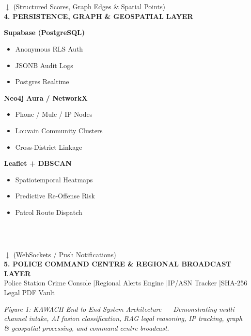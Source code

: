 \documentclass[10pt]{article}
\begin{document}
\begin{center}
{\begin{minipage}{0.98\linewidth}
\begin{minipage}[t]{0.48\linewidth}
\begin{itemize}[leftmargin=8pt,topsep=1pt,itemsep=1pt]
\end{itemize}
\end{minipage}\\
\vspace{2pt}
\hrulefill\\
\begin{center}
$\downarrow$ (Structured Scores, Graph Edges \& Spatial Points)\\
\textbf{4. PERSISTENCE, GRAPH \& GEOSPATIAL LAYER}\\
\end{center}
\begin{minipage}[t]{0.31\linewidth}
\raggedright
\textbf{Supabase (PostgreSQL)}
\begin{itemize}[leftmargin=8pt,topsep=1pt,itemsep=1pt]
\item Anonymous RLS Auth
\item JSONB Audit Logs
\item Postgres Realtime
\end{itemize}
\end{minipage}
\hfill
\begin{minipage}[t]{0.33\linewidth}
\raggedright
\textbf{Neo4j Aura / NetworkX}
\begin{itemize}[leftmargin=8pt,topsep=1pt,itemsep=1pt]
\item Phone / Mule / IP Nodes
\item Louvain Community Clusters
\item Cross-District Linkage
\end{itemize}
\end{minipage}
\hfill
\begin{minipage}[t]{0.31\linewidth}
\raggedright
\textbf{Leaflet + DBSCAN}
\begin{itemize}[leftmargin=8pt,topsep=1pt,itemsep=1pt]
\item Spatiotemporal Heatmaps
\item Predictive Re-Offense Risk
\item Patrol Route Dispatch
\end{itemize}
\end{minipage}\\
\vspace{2pt}
\hrulefill\\
\begin{center}
$\downarrow$ (WebSockets / Push Notifications)\\
\textbf{5. POLICE COMMAND CENTRE \& REGIONAL BROADCAST LAYER}\\
Police Station Crime Console \quad|\quad Regional Alerts Engine \quad|\quad IP/ASN Tracker \quad|\quad SHA-256 Legal PDF Vault\\
\end{center}
\vspace{4pt}
\end{minipage}}
\end{center}
\small\textit{Figure 1: KAWACH End-to-End System Architecture --- Demonstrating multi-channel intake, AI fusion classification, RAG legal reasoning, IP tracking, graph \& geospatial processing, and command centre broadcast.}\normalsize
\end{document}

